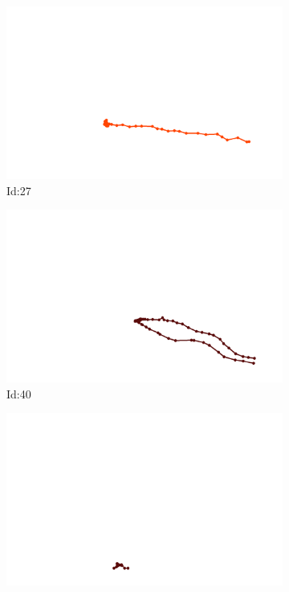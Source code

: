 \documentclass[12pt,twoside]{report}
\begin{document}
\begin{figure}
\centering
\begin{subfigure}[b]{0.20\textwidth}
\centering
\includegraphics[width=\textwidth]{../trajectories/27.png}
\caption{Id:27}
\end{subfigure}
\begin{subfigure}[b]{0.20\textwidth}
\centering
\includegraphics[width=\textwidth]{../trajectories/40.png}
\caption{Id:40}
\end{subfigure}
\begin{subfigure}[b]{0.20\textwidth}
\centering
\includegraphics[width=\textwidth]{../trajectories/61.png}

\end{subfigure}
\end{figure}
\end{document}
